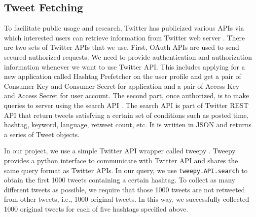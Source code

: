 \documentclass[letterpaper,11pt,twocolumn]{article}
\begin{document}
\subsection{Tweet Fetching}
To facilitate public usage and research, Twitter has publicized various APIs via which interested users can retrieve information from Twitter web server \cite{twitterdocument}. There are two sets of Twitter APIs that we use. First, OAuth APIs \cite{twitteroauth} are used to send secured authorized requests. We need to provide authentication and authorization information whenever we want to use Twitter API. This includes applying for a new application called Hashtag Prefetcher on the user profile and get a pair of Consumer Key and Consumer Secret for application and a pair of Access Key and Access Secret for user account. The second part, once authorized, is to make queries to server using the search API \cite{twittersearch}. The search API is part of Twitter REST API that return tweets satisfying a certain set of conditions such as posted time, hashtag, keyword, language, retweet count, etc. It is written in JSON and returns a series of Tweet objects.

In our project, we use a simple Twitter API wrapper called tweepy \cite{tweepy}. Tweepy provides a python interface to communicate with Twitter API and shares the same query format as Twitter APIs. In our query, we use \texttt{tweepy.API.search} to obtain the first 1000 tweets containing a certain hashtag. To collect as many different tweets as possible, we require that those 1000 tweets are not retweeted from other tweets, i.e., 1000 original tweets. In this way, we successfully collected 1000 original tweets for each of five hashtags specified above.
\end{document}

